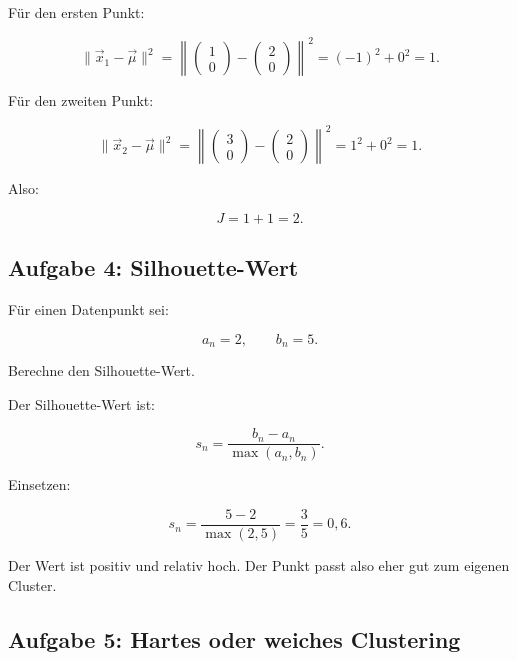 \begin{examplebox}
Für den ersten Punkt:

\[
    \|\vec{x}_1-\vec{\mu}\|^2
    =
    \left\|
    \begin{pmatrix}
        1 \\
        0
    \end{pmatrix}
    -
    \begin{pmatrix}
        2 \\
        0
    \end{pmatrix}
    \right\|^2
    =
    (-1)^2+0^2
    =
    1.
\]

Für den zweiten Punkt:

\[
    \|\vec{x}_2-\vec{\mu}\|^2
    =
    \left\|
    \begin{pmatrix}
        3 \\
        0
    \end{pmatrix}
    -
    \begin{pmatrix}
        2 \\
        0
    \end{pmatrix}
    \right\|^2
    =
    1^2+0^2
    =
    1.
\]

Also:

\[
    J
    =
    1+1
    =
    2.
\]
\end{examplebox}

\subsection{Aufgabe 4: Silhouette-Wert}

Für einen Datenpunkt sei:

\[
    a_n=2,
    \qquad
    b_n=5.
\]

Berechne den Silhouette-Wert.

\begin{examplebox}
Der Silhouette-Wert ist:

\[
    s_n
    =
    \frac{b_n-a_n}{\max(a_n,b_n)}.
\]

Einsetzen:

\[
    s_n
    =
    \frac{5-2}{\max(2,5)}
    =
    \frac{3}{5}
    =
    0{,}6.
\]

Der Wert ist positiv und relativ hoch.
Der Punkt passt also eher gut zum eigenen Cluster.
\end{examplebox}

\subsection{Aufgabe 5: Hartes oder weiches Clustering}


